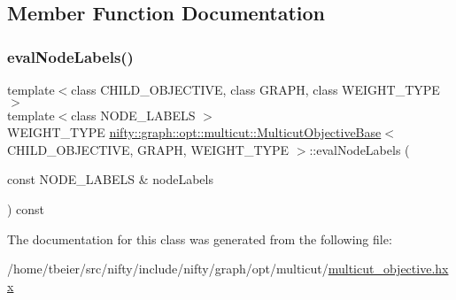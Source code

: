\subsection{Member Function Documentation}
\mbox{\label{classnifty_1_1graph_1_1opt_1_1multicut_1_1MulticutObjectiveBase_a46baad38ba237fc1bca02ec5719dd869}} 
\subsubsection{\texorpdfstring{eval\+Node\+Labels()}{evalNodeLabels()}}
{\footnotesize\ttfamily template$<$class C\+H\+I\+L\+D\+\_\+\+O\+B\+J\+E\+C\+T\+I\+VE, class G\+R\+A\+PH, class W\+E\+I\+G\+H\+T\+\_\+\+T\+Y\+PE$>$ \\
template$<$class N\+O\+D\+E\+\_\+\+L\+A\+B\+E\+LS $>$ \\
W\+E\+I\+G\+H\+T\+\_\+\+T\+Y\+PE \hyperlink{classnifty_1_1graph_1_1opt_1_1multicut_1_1MulticutObjectiveBase}{nifty\+::graph\+::opt\+::multicut\+::\+Multicut\+Objective\+Base}$<$ C\+H\+I\+L\+D\+\_\+\+O\+B\+J\+E\+C\+T\+I\+VE, G\+R\+A\+PH, W\+E\+I\+G\+H\+T\+\_\+\+T\+Y\+PE $>$\+::eval\+Node\+Labels (\begin{DoxyParamCaption}\item[{const N\+O\+D\+E\+\_\+\+L\+A\+B\+E\+LS \&}]{node\+Labels }\end{DoxyParamCaption}) const\hspace{0.3cm}{\ttfamily [inline]}}



The documentation for this class was generated from the following file\+:\begin{DoxyCompactItemize}
\item 
/home/tbeier/src/nifty/include/nifty/graph/opt/multicut/\hyperlink{graph_2opt_2multicut_2multicut__objective_8hxx}{multicut\+\_\+objective.\+hxx}\end{DoxyCompactItemize}
